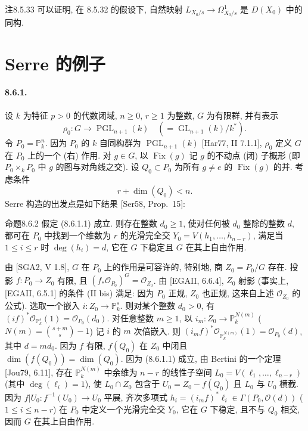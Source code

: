 \begin{origstatement}{注}{8.5.33}\label{ch08:rem8533}
可以证明, 在 8.5.32 的假设下, 自然映射 $L_{X_0/s}\to\Omega^1_{X_0/s}$ 是 $D(X_0)$ 中的同构.
\end{origstatement}

\section{Serre 的例子}\label{ch08:sec86}
\paragraph{8.6.1.}
设 $k$ 为特征 $p>0$ 的代数闭域, $n\geq0$, $r\geq1$ 为整数, $G$ 为有限群, 并有表示
\[\rho_0:G\longrightarrow\operatorname{PGL}_{n+1}(k)\quad(=\operatorname{GL}_{n+1}(k)/k^*).\]
令 $P_0=\mathbb P_k^n$. 因为 $P_0$ 的 $k$ 自同构群为 $\operatorname{PGL}_{n+1}(k)$ [Har77, II 7.1.1], $\rho_0$ 定义 $G$ 在 $P_0$ 上的一个 (右) 作用. 对 $g\in G$, 以 $\operatorname{Fix}(g)$ 记 $g$ 的不动点 (闭) 子概形 (即 $P_0\times_kP_0$ 中 $g$ 的图与对角线之交). 设 $Q_0\subset P_0$ 为所有 $g\ne e$ 的 $\operatorname{Fix}(g)$ 的并. 考虑条件
\begin{equation}r+\dim(Q_0)<n.\tag{8.6.1.1}\label{ch08:eq8611}\end{equation}
Serre 构造的出发点是如下结果 [Ser58, Prop.~15]:

\begin{origstatement}{命题}{8.6.2}\label{ch08:prop862}
假定 (8.6.1.1) 成立. 则存在整数 $d_0\geq1$, 使对任何被 $d_0$ 整除的整数 $d$, 都可在 $P_0$ 中找到一个维数为 $r$ 的光滑完全交 $Y_0=V(h_1,\ldots,h_{n-r})$, 满足当 $1\leq i\leq r$ 时 $\deg(h_i)=d$, 它在 $G$ 下稳定且 $G$ 在其上自由作用.
\end{origstatement}
由 [SGA2, V 1.8], $G$ 在 $P_0$ 上的作用是可容许的, 特别地, 商 $Z_0=P_0/G$ 存在. 投影 $f:P_0\to Z_0$ 有限, 且 $(f_*\mathcal O_{P_0})^G=\mathcal O_{Z_0}$. 由 [EGAII, 6.6.4], $Z_0$ 射影 (事实上, [EGAII, 6.5.1] 的条件 (II bis) 满足: 因为 $P_0$ 正规, $Z_0$ 也正规, 这来自上述 $\mathcal O_{Z_0}$ 的公式). 选取一个嵌入 $i:Z_0\to\mathbb P_k^s$. 则对某个整数 $d_0>0$, 有 $(if)^*\mathcal O_{\mathbb P_k^s}(1)=\mathcal O_{P_0}(d_0)$. 对任意整数 $m\geq1$, 以 $i_m:Z_0\to\mathbb P_k^{N(m)}$ ($N(m)=\binom{s+m}{s}-1$) 记 $i$ 的 $m$ 次倍嵌入. 则 $(i_mf)^*\mathcal O_{\mathbb P_k^{N(m)}}(1)=\mathcal O_{P_0}(d)$, 其中 $d=md_0$. 因为 $f$ 有限, $f(Q_0)$ 在 $Z_0$ 中闭且 $\dim(f(Q_0))=\dim(Q_0)$. 因为 (8.6.1.1) 成立, 由 Bertini 的一个定理 [Jou79, 6.11], 存在 $\mathbb P_k^{N(m)}$ 中余维为 $n-r$ 的线性子空间 $L_0=V(\ell_1,\ldots,\ell_{n-r})$ (其中 $\deg(\ell_i)=1$), 使 $L_0\cap Z_0$ 包含于 $U_0=Z_0-f(Q_0)$ 且 $L_0$ 与 $U_0$ 横截. 因为 $f|U_0:f^{-1}(U_0)\to U_0$ 平展, 齐次多项式 $h_i=(i_mf)^*\ell_i\in\Gamma(P_0,\mathcal O(d))$ ($1\leq i\leq n-r$) 在 $P_0$ 中定义一个光滑完全交 $Y_0$, 它在 $G$ 下稳定, 且不与 $Q_0$ 相交, 因而 $G$ 在其上自由作用.

